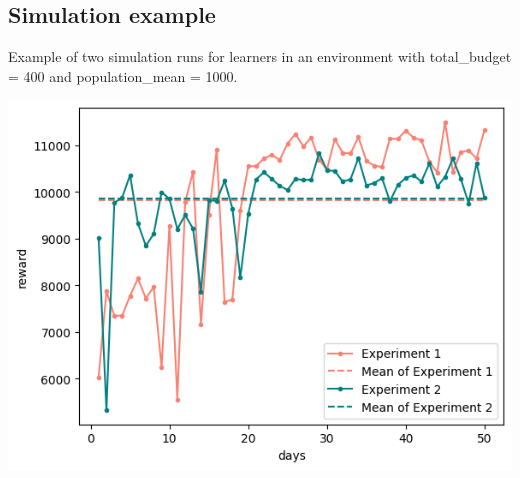 \subsection{Simulation example}

Example of two simulation runs for learners in an environment with total\_budget = 400 and population\_mean = 1000.

\begin{center}
    \includegraphics[scale=0.5]{img/Graphs/env_sim/image1.png}
\end{center}
